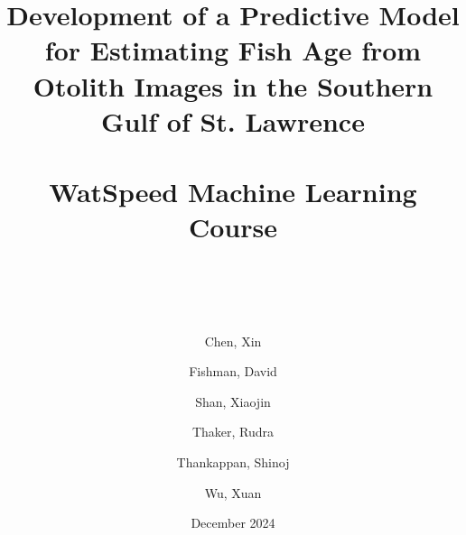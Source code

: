 \title{
    Development of a Predictive Model for Estimating Fish Age from Otolith Images in the Southern Gulf of St. Lawrence \\~\\
    \large WatSpeed Machine Learning Course  \\~\\~\\
}


\date{December 2024}

\author[1]{Chen, Xin}
\author[2]{Fishman, David}
\author[3]{Shan, Xiaojin}
\author[4]{Thaker, Rudra}
\author[5]{Thankappan, Shinoj}
\author[6]{Wu, Xuan}

{
    \makeatletter
    \renewcommand\AB@affilsepx{: \protect\Affilfont}
    \makeatother


    \makeatletter
    \renewcommand\AB@affilsepx{, \protect\Affilfont}
    \makeatother

}

\maketitle